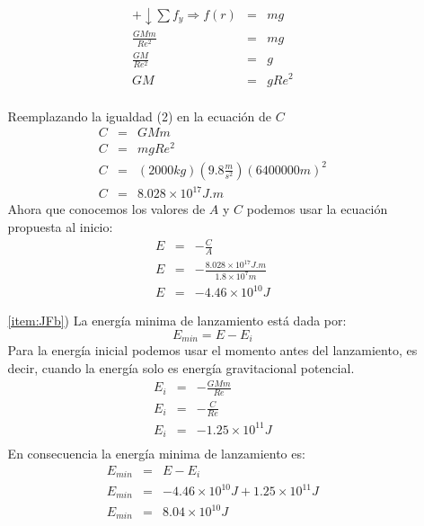 \documentclass[12pt]{article}
\begin{document}
\begin{enumerate}
\begin{itemize}
\begin{center}
\begin{eqnarray}
+\downarrow \sum f_y \Longrightarrow f(r)&=&m g\nonumber\\
\frac{G M m}{Re^2}&=&m g\nonumber\\
\frac{G M}{Re^2}&=&g\nonumber\\
G M&=&g Re^2\\
\nonumber
\end{eqnarray}    

\end{center}
Reemplazando la igualdad (2) en la ecuación de $C$\\
\begin{eqnarray}
C&=&G M m\nonumber\\
C&=&m g Re^2\nonumber\\
C&=&(2000 kg)(9.8\frac{m}{s^2})(6400000 m)^2\nonumber\\
C&=&8.028\times 10^{17} J.m
\end{eqnarray}
Ahora que conocemos los valores de $A$ y $C$ podemos usar la ecuación propuesta al inicio:\\
\begin{eqnarray}
E&=&-\frac{C}{A}\nonumber\\
E&=&-\frac{8.028\times 10^{17} J.m}{1.8\times10^7 m}\nonumber\\
E&=&-4.46\times10^{10} J
\end{eqnarray}
  
  \item[\ref{item:JFb})] 
  La energía minima de lanzamiento está dada por:
 \begin{equation} 
 E_{min}=E-E_i\nonumber
 \end{equation}
 Para la energía inicial podemos usar el momento antes del lanzamiento, es decir, cuando la energía solo es energía gravitacional potencial.\\
 \begin{eqnarray}
 E_i&=&-\frac{G M m}{Re}\nonumber\\
 E_i&=&-\frac{C}{Re}\nonumber\\
 E_i&=&-1.25\times10^{11} J\\
 \nonumber
 \end{eqnarray}
 En consecuencia la energía minima de lanzamiento es:\
 \begin{eqnarray}
 E_{min}&=&E-E_i\nonumber\\
 E_{min}&=&-4.46\times10^{10} J + 1.25\times10^{11} J\nonumber\\
 E_{min}&=&8.04\times10^{10} J\\
 \nonumber
\end{eqnarray}
  

\end{itemize}
\end{enumerate}
\end{document}
